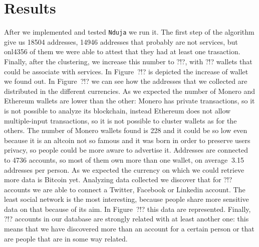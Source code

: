 \newcommand{\startingNumberAllWallets}{18504}
\newcommand{\startingNumberWalletsNotService}{14946}
\newcommand{\startingNumberWalletsAtLeastOneTransaction}{4356}
\newcommand{\clusteringNumberAllWallets}{?!?}
\newcommand{\clusteringNumberWalletsNotService}{?!?}
\newcommand{\startingBTC}{4954}
\newcommand{\startingLTC}{3050}
\newcommand{\startingXMR}{228}
\newcommand{\startingETH}{6714}
\newcommand{\accountNumber}{4736}
\newcommand{\avarageAccount}{$~$3.15}


\section{Results}
After we implemented and tested \texttt{Nduja} we run it. The first step of the
algorithm give us \startingNumberAllWallets{} addresses,
\startingNumberWalletsNotService{} addresses that probably are not services, but onl\startingNumberWalletsAtLeastOneTransaction{} of them we were able to attest that they had at least one trasaction. Finally, after the clustering, we increase this number to \clusteringNumberAllWallets{}, with \clusteringNumberWalletsNotService{} wallets that could be associate with services. In Figure~?!? is depicted the increase of wallet we found out. In Figure~?!? we can see how the addresses that we collected are distributed in the different currencies. As we expected the number of Monero and Ethereum wallets are lower than the other: Monero has private transactions, so it is not possible to analyze its blockchain, instead Ethereum does not allow multiple-input transactions, so it is not possible to cluster wallets as for the others. The number of Monero wallets found is \startingXMR{} and it could be so low even because it is an altcoin not so famous and it was born in order to preserve users privacy, so people could be more aware to advertise it. Addresses are connected to \accountNumber{} accounts, so most of them own more than one wallet, on average \avarageAccount{}  addresses per person. As we expected the currency on which we could retrieve more data is Bitcoin yet. Analyzing data collected we discover that for ?!? accounts we are able to connect a Twitter, Facebook or Linkedin account. The least social network is the most interesting, because people share more sensitive data on that because of its aim. In Figure~?!? this data are represented. Finally, ?!? accounts in our database are strongly related with at least another one: this means that we have discovered more than an account for a certain person or that are people that are in some way related.